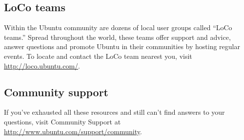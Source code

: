 
\subsection{LoCo teams}

Within the Ubuntu community are dozens of local user groups called ``LoCo teams.'' Spread throughout the world, these teams offer support and advice, answer questions and promote Ubuntu in their communities by hosting regular events. To locate and contact the LoCo team nearest you, visit \url{http://loco.ubuntu.com/}.

\subsection{Community support}

If you've exhausted all these resources and still can't find answers to your questions, visit Community Support at \url{http://www.ubuntu.com/support/community}.
